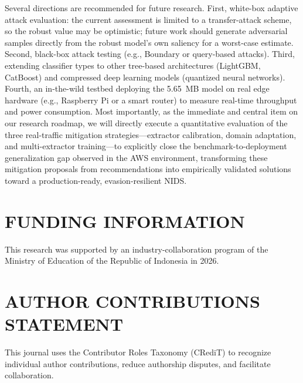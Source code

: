 \documentclass{iaesarticle}
\begin{document}
Several directions are recommended for future research. First, white-box adaptive attack evaluation: the current assessment is limited to a transfer-attack scheme, so the robust value may be optimistic; future work should generate adversarial samples directly from the robust model's own saliency for a worst-case estimate. Second, black-box attack testing (e.g., Boundary or query-based attacks). Third, extending classifier types to other tree-based architectures (LightGBM, CatBoost) and compressed deep learning models (quantized neural networks). Fourth, an in-the-wild testbed deploying the 5.65~MB model on real edge hardware (e.g., Raspberry Pi or a smart router) to measure real-time throughput and power consumption. Most importantly, as the immediate and central item on our research roadmap, we will directly execute a quantitative evaluation of the three real-traffic mitigation strategies---extractor calibration, domain adaptation, and multi-extractor training---to explicitly close the benchmark-to-deployment generalization gap observed in the AWS environment, transforming these mitigation proposals from recommendations into empirically validated solutions toward a production-ready, evasion-resilient NIDS.

\section*{FUNDING INFORMATION}
This research was supported by an industry-collaboration program of the Ministry of Education of the Republic of Indonesia in 2026.

\section*{AUTHOR CONTRIBUTIONS STATEMENT}
This journal uses the Contributor Roles Taxonomy (CRediT) to recognize individual author contributions, reduce authorship disputes, and facilitate collaboration.
\end{document}
